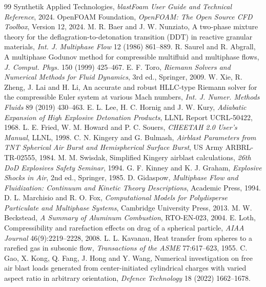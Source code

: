 \documentclass{article}
\begin{document}
\begin{thebibliography}{99}
     Synthetik Applied Technologies, \emph{blastFoam User Guide and Technical Reference}, 2024.
     OpenFOAM Foundation, \emph{OpenFOAM: The Open Source CFD Toolbox}, Version 12, 2024.
     M. R. Baer and J. W. Nunziato, A two-phase mixture theory for the deflagration-to-detonation transition (DDT) in reactive granular materials, \emph{Int. J. Multiphase Flow} 12 (1986) 861--889.
     R. Saurel and R. Abgrall, A multiphase Godunov method for compressible multifluid and multiphase flows, \emph{J. Comput. Phys.} 150 (1999) 425--467.
     E. F. Toro, \emph{Riemann Solvers and Numerical Methods for Fluid Dynamics}, 3rd ed., Springer, 2009.
     W. Xie, R. Zheng, J. Lai and H. Li, An accurate and robust HLLC-type Riemann solver for the compressible Euler system at various Mach numbers, \emph{Int. J. Numer. Methods Fluids} 89 (2019) 430--463.
     E. L. Lee, H. C. Hornig and J. W. Kury, \emph{Adiabatic Expansion of High Explosive Detonation Products}, LLNL Report UCRL-50422, 1968.
     L. E. Fried, W. M. Howard and P. C. Souers, \emph{CHEETAH 2.0 User's Manual}, LLNL, 1998.
     C. N. Kingery and G. Bulmash, \emph{Airblast Parameters from TNT Spherical Air Burst and Hemispherical Surface Burst}, US Army ARBRL-TR-02555, 1984.
     M. M. Swisdak, Simplified Kingery airblast calculations, \emph{26th DoD Explosives Safety Seminar}, 1994.
     G. F. Kinney and K. J. Graham, \emph{Explosive Shocks in Air}, 2nd ed., Springer, 1985.
     D. Gidaspow, \emph{Multiphase Flow and Fluidization: Continuum and Kinetic Theory Descriptions}, Academic Press, 1994.
     D. L. Marchisio and R. O. Fox, \emph{Computational Models for Polydisperse Particulate and Multiphase Systems}, Cambridge University Press, 2013.
     M. W. Beckstead, \emph{A Summary of Aluminum Combustion}, RTO-EN-023, 2004.
     E. Loth, Compressibility and rarefaction effects on drag of a spherical particle, \emph{AIAA Journal} 46(9):2219--2228, 2008.
     L. L. Kavanau, Heat transfer from spheres to a rarefied gas in subsonic flow, \emph{Transactions of the ASME} 77:617--623, 1955.
     C. Gao, X. Kong, Q. Fang, J. Hong and Y. Wang, Numerical investigation on free air blast loads generated from center-initiated cylindrical charges with varied aspect ratio in arbitrary orientation, \emph{Defence Technology} 18 (2022) 1662--1678.

\end{thebibliography}
\end{document}
